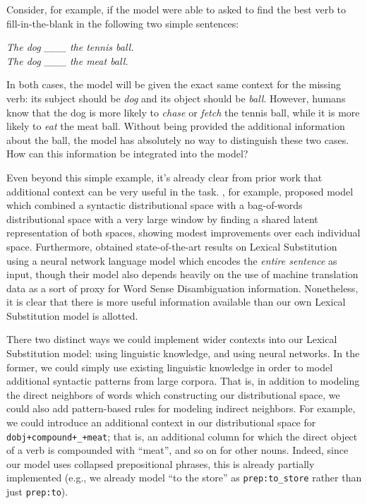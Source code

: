 \documentclass[letterpaper]{article}
\begin{document}
Consider, for example, if the model were able to asked to find the best verb
to fill-in-the-blank in the following two simple sentences:

\begin{center}
  {\em The dog \_\_\_ the tennis ball.}\\
  {\em The dog \_\_\_ the meat ball.}
\end{center}

In both cases, the model will be given the exact same context for the missing
verb: its subject should be {\em dog} and its object should be {\em ball}. However,
humans know that the dog is more likely to {\em chase} or {\em fetch} the tennis
ball, while it is more likely to {\em eat} the meat ball. Without being provided
the additional information about the ball, the model has absolutely no way
to distinguish these two cases. How can this information be integrated into the
model?

Even beyond this simple example, it's already clear from prior work that
additional context can be very useful in the task.
, for example, proposed model which combined
a syntactic distributional space with a bag-of-words distributional space with
a very large window by finding a shared latent representation of both spaces,
showing modest improvements over each individual space. Furthermore,
 obtained state-of-the-art results on Lexical
Substitution using a neural network language model which encodes the {\em
entire sentence} as input, though their model also depends heavily on the use
of machine translation data as a sort of proxy for Word Sense Disambiguation
information. Nonetheless, it is clear that there is more useful information
available than our own Lexical Substitution model is allotted.

There two distinct ways we could implement wider contexts into our Lexical
Substitution model: using linguistic knowledge, and using neural networks.
In the former, we could simply use existing linguistic knowledge in order to
model additional syntactic patterns from large corpora. That is, in
addition to modeling the direct neighbors of words which constructing our
distributional space, we could also add pattern-based rules for modeling
indirect neighbors. For example, we could introduce an additional context
in our distributional space for {\tt dobj+compound+\_+meat}; that is, an
additional column for which the direct object of a verb is compounded with
``meat'', and so on for other nouns. Indeed, since our model uses collapsed
prepositional phrases, this is already partially implemented (e.g., we already
model ``to the store'' as {\tt prep:to\_store} rather than just {\tt prep:to}).
\end{document}
